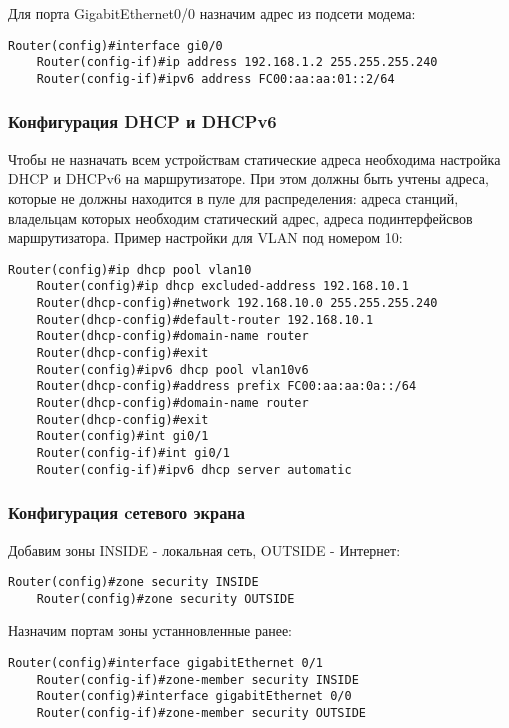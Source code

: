 Для порта GigabitEthernet0/0 назначим адрес из подсети модема:

\begin{lstlisting}[xleftmargin=-2.5em]
    Router(config)#interface gi0/0
    Router(config-if)#ip address 192.168.1.2 255.255.255.240
    Router(config-if)#ipv6 address FC00:aa:aa:01::2/64
\end{lstlisting}

\subsubsection{Конфигурация DHCP и DHCPv6}

Чтобы не назначать всем устройствам статические адреса необходима настройка DHCP и DHCPv6 на маршрутизаторе.
При этом должны быть учтены адреса, которые не должны находится в пуле для распределения: 
адреса станций, владельцам которых необходим статический адрес, 
адреса подинтерфейсвов маршрутизатора. Пример настройки для VLAN под номером 10: 

\begin{lstlisting}[xleftmargin=-2.5em]
    Router(config)#ip dhcp pool vlan10
    Router(config)#ip dhcp excluded-address 192.168.10.1
    Router(dhcp-config)#network 192.168.10.0 255.255.255.240
    Router(dhcp-config)#default-router 192.168.10.1
    Router(dhcp-config)#domain-name router
    Router(dhcp-config)#exit
    Router(config)#ipv6 dhcp pool vlan10v6
    Router(dhcp-config)#address prefix FC00:aa:aa:0a::/64
    Router(dhcp-config)#domain-name router
    Router(dhcp-config)#exit
    Router(config)#int gi0/1
    Router(config-if)#int gi0/1
    Router(config-if)#ipv6 dhcp server automatic
\end{lstlisting}

\subsubsection{Конфигурация cетевого экрана}
Добавим зоны INSIDE - локальная сеть, OUTSIDE - Интернет:
\begin{lstlisting}[xleftmargin=-2.5em]
    Router(config)#zone security INSIDE
    Router(config)#zone security OUTSIDE
\end{lstlisting}

Назначим портам зоны устанновленные ранее:
\begin{lstlisting}[xleftmargin=-2.5em]
    Router(config)#interface gigabitEthernet 0/1
    Router(config-if)#zone-member security INSIDE
    Router(config)#interface gigabitEthernet 0/0
    Router(config-if)#zone-member security OUTSIDE
\end{lstlisting}

